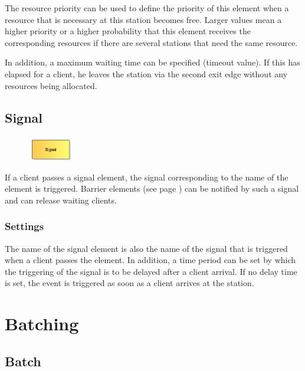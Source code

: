 The resource priority can be used to define the priority of this element when a resource that
is necessary at this station becomes free. Larger values mean a higher priority or a higher probability
that this element receives the corresponding resources if there are several stations that need the same resource.

In addition, a maximum waiting time can be specified (timeout value). If this has elapsed for a client, he leaves
the station via the second exit edge without any resources being allocated.


\section{Signal}
\label{ref:ModelElementSignal}

\begin{figure}
\vspace{-22pt}
\includegraphics[width=2cm]{imageModelElementSignal.png}
\vspace{-22pt}
\end{figure}

If a client passes a signal element, the signal corresponding to the name of the element is triggered.
Barrier elements (see page \pageref{ref:ModelElementBarrier}) can be notified by such a signal and can release waiting clients.

\subsection*{Settings}

The name of the signal element is also the name of the signal that is triggered when a client passes the element.
In addition, a time period can be set by which the triggering of the signal is to be delayed after a client arrival.
If no delay time is set, the event is triggered as soon as a client arrives at the station.





\chapter{Batching}

\section{Batch}
\label{ref:ModelElementBatch}

